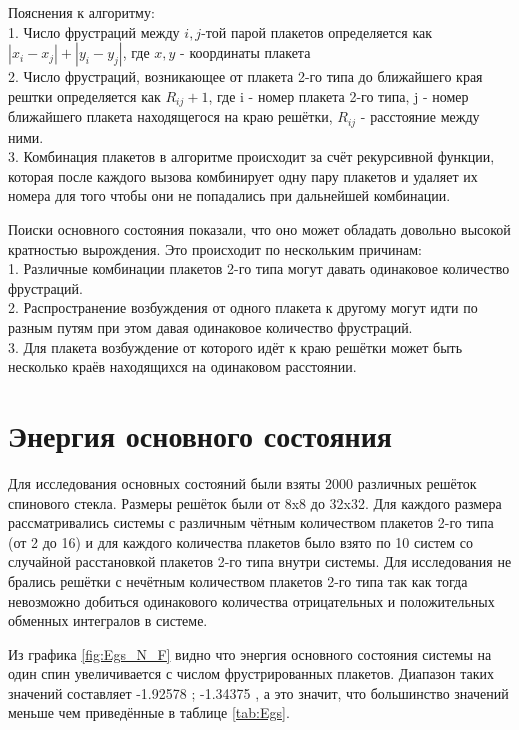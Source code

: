 \documentclass[utf8, babel, sor, jor, amsmath, amssymb, reprint]{elsarticle} %
\begin{document}
Пояснения к алгоритму:\\
1. Число фрустраций между $i,j$-той парой плакетов определяется как $\left|x_i-x_j\right|+\left|y_i-y_j\right|$, где $x, y$ - координаты плакета\\
2. Число фрустраций, возникающее от плакета 2-го типа до ближайшего края рештки определяется как $R_{ij}+1$, где i - номер плакета 2-го типа, j - номер ближайшего плакета находящегося на краю решётки, $R_{ij}$ - расстояние между ними.\\
3. Комбинация плакетов в алгоритме происходит за счёт рекурсивной функции, которая после каждого вызова комбинирует одну пару плакетов и удаляет их номера для того чтобы они не попадались при дальнейшей комбинации. 

Поиски основного состояния показали, что оно может обладать довольно высокой кратностью вырождения. Это происходит по нескольким причинам:\\
1. Различные комбинации плакетов 2-го типа могут давать одинаковое количество фрустраций.\\
2. Распространение возбуждения от одного плакета к другому могут идти по разным путям при этом давая одинаковое количество фрустраций.\\
3. Для плакета возбуждение от которого идёт к краю решётки может быть несколько краёв находящихся на одинаковом расстоянии.\\

\section{Энергия основного состояния}
Для исследования основных состояний были взяты 2000 различных решёток спинового стекла.
Размеры решёток были от 8x8 до 32x32. Для каждого размера рассматривались системы с различным чётным количеством плакетов 2-го типа (от 2 до 16) и для каждого количества плакетов было взято по 10 систем со случайной расстановкой плакетов 2-го типа внутри системы. Для исследования не  брались решётки с нечётным количеством плакетов 2-го типа так как тогда невозможно добиться одинакового количества отрицательных и положительных обменных интегралов в системе. 

Из графика \ref{fig:Egs_N_F} видно что энергия основного состояния системы на один спин увеличивается с числом фрустрированных плакетов. Диапазон таких значений составляет -1.92578 ; -1.34375 , а это значит, что большинство значений меньше чем приведённые в таблице \ref{tab:Egs}. 
\end{document}

